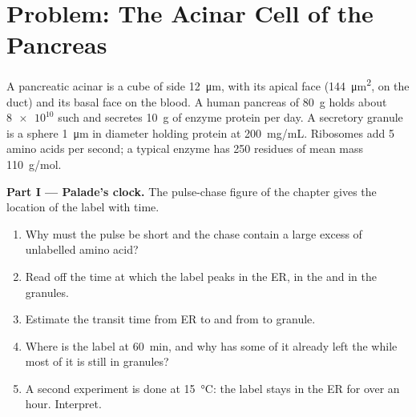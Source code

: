 \section{Problem: The Acinar Cell of the Pancreas}

\begin{problem}
\label{pb:b1:eukaryotic-cell:1}
A pancreatic acinar  is a cube of side \qty{12}{\micro m}, with its
apical face (\qty{144}{\micro m^2}, on the duct) and its basal face on
the blood. A human pancreas of \qty{80}{g} holds about $\num{8e10}$
such  and secretes \qty{10}{g} of enzyme protein per day. A
secretory granule is a sphere \qty{1}{\micro m} in diameter holding
protein at \qty{200}{mg/mL}. Ribosomes add \qty{5}{} amino acids per
second; a typical enzyme has \qty{250}{} residues of mean mass
\qty{110}{g/mol}.

\medskip
\noindent\textbf{Part I --- Palade's clock.}
The pulse-chase figure of the chapter gives the location of the label
with time.
\begin{enumerate}
  \item Why must the pulse be short and the chase contain a large
        excess of unlabelled amino acid?
  \item Read off the time at which the label peaks in the ER, in the
         and in the granules.
  \item Estimate the transit time from ER to  and from  to
        granule.
  \item Where is the label at \qty{60}{min}, and why has some of it
        already left the  while most of it is still in granules?
  \item A second experiment is done at \qty{15}{\celsius}: the label
        stays in the ER for over an hour. Interpret.
\end{enumerate}


\end{problem}
